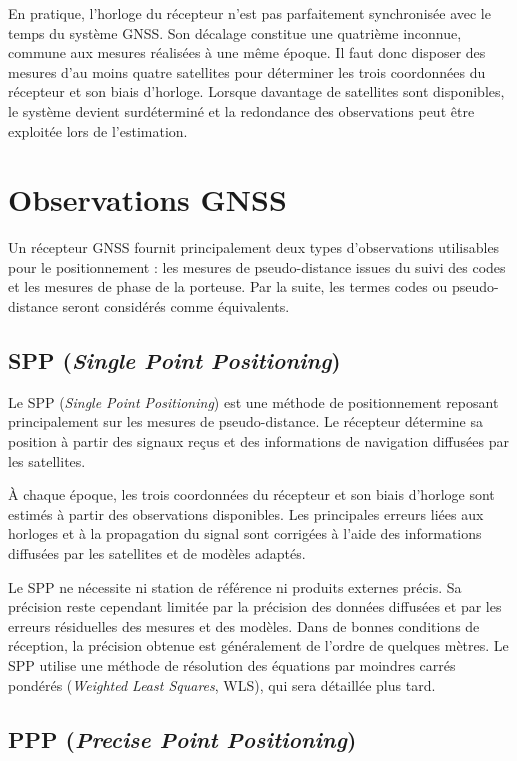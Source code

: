 En pratique, l'horloge du récepteur n'est pas parfaitement synchronisée avec
le temps du système GNSS. Son décalage constitue une quatrième inconnue,
commune aux mesures réalisées à une même époque. Il faut donc disposer des
mesures d'au moins quatre satellites pour déterminer les trois coordonnées du
récepteur et son biais d'horloge. Lorsque davantage de satellites sont
disponibles, le système devient surdéterminé et la redondance des observations
peut être exploitée lors de l'estimation.


\section{Observations GNSS}

Un récepteur GNSS fournit principalement deux types d'observations utilisables
pour le positionnement : les mesures de pseudo-distance issues du suivi des
codes et les mesures de phase de la porteuse. Par la suite, 
les termes codes ou pseudo-distance seront considérés comme équivalents.




\subsection{SPP (\textit{Single Point Positioning})}

Le SPP (\textit{Single Point Positioning}) est une méthode de positionnement
reposant principalement sur les mesures de pseudo-distance. Le
récepteur détermine sa position à partir des signaux reçus
et des informations de navigation diffusées par les satellites.

À chaque époque, les trois coordonnées du récepteur et son biais d'horloge sont
estimés à partir des observations disponibles. Les principales erreurs liées
aux horloges et à la propagation du signal sont corrigées à l'aide des
informations diffusées par les satellites et de modèles adaptés.

Le SPP ne nécessite ni station de référence ni produits externes précis. Sa
précision reste cependant limitée par la précision des données diffusées et
par les erreurs résiduelles des mesures et des modèles. Dans de bonnes
conditions de réception, la précision obtenue est généralement de l'ordre de
quelques mètres. Le SPP utilise une méthode de résolution des équations par moindres carrés pondérés (\textit{Weighted Least Squares}, WLS), qui sera détaillée plus tard.


\subsection{PPP (\textit{Precise Point Positioning})}

